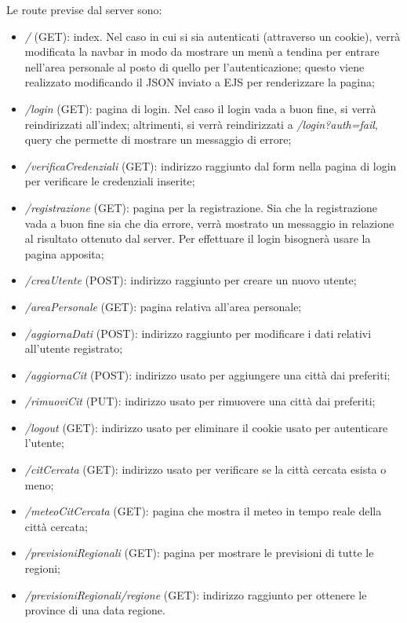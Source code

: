 Le route previse dal server sono:
\begin{itemize}
    \item \emph{/} (GET): index. Nel caso in cui si sia autenticati (attraverso un cookie), verrà modificata la 
    navbar in modo da mostrare un menù a tendina per entrare nell'area personale al posto di quello per l'autenticazione; 
    questo viene realizzato modificando il JSON inviato a EJS per renderizzare la pagina;
    \item \emph{/login} (GET): pagina di login. Nel caso il login vada a buon fine, si verrà reindirizzati all'index; altrimenti, 
    si verrà reindirizzati a \emph{/login?auth=fail}, query che permette di mostrare un messaggio di errore;
    \item \emph{/verificaCredenziali} (GET): indirizzo raggiunto dal form nella pagina di login per verificare le credenziali 
    inserite;
    \item \emph{/registrazione} (GET): pagina per la registrazione. Sia che la registrazione vada a buon fine sia che dia errore, 
    verrà mostrato un messaggio in relazione al risultato ottenuto dal server. Per effettuare il login bisognerà usare la pagina 
    apposita;
    \item \emph{/creaUtente} (POST): indirizzo raggiunto per creare un nuovo utente;
    \item \emph{/areaPersonale} (GET): pagina relativa all'area personale;
    \item \emph{/aggiornaDati} (POST): indirizzo raggiunto per modificare i dati relativi all'utente registrato;
    \item \emph{/aggiornaCit} (POST): indirizzo usato per aggiungere una città dai preferiti;
    \item \emph{/rimuoviCit} (PUT): indirizzo usato per rimuovere una città dai preferiti;
    \item \emph{/logout} (GET): indirizzo usato per eliminare il cookie usato per autenticare l'utente;
    \item \emph{/citCercata} (GET): indirizzo usato per verificare se la città cercata esista o meno;
    \item \emph{/meteoCitCercata} (GET): pagina che mostra il meteo in tempo reale della città cercata;
    \item \emph{/previsioniRegionali} (GET): pagina per mostrare le previsioni di tutte le regioni;
    \item \emph{/previsioniRegionali/regione} (GET): indirizzo raggiunto per ottenere le province di una data regione.
\end{itemize}

